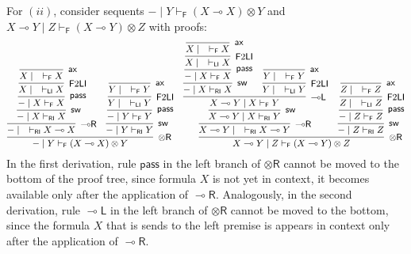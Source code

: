 \documentclass[submission,copyright,creativecommons]{eptcs}
\theoremstyle{definition}
\newcommand{\tr}{\otimes \mathsf{R}}
\newcommand{\lright}{{\multimap}\mathsf{R}}
\newcommand{\lleft}{{\multimap}\mathsf{L}}
\newcommand{\pass}{\mathsf{pass}}
\newcommand{\ax}{\mathsf{ax}}
\newcommand{\ot}{\otimes}
\newcommand{\lolli}{\multimap}
\newcommand{\RI}{\mathsf{RI}}
\newcommand{\LI}{\mathsf{LI}}
\newcommand{\F}{\mathsf{F}}
\newcommand{\SkNMILLA}{$\mathtt{SkNMILLA}$}
\begin{document}
For $(ii)$, consider sequents ${-} \mid Y \vdash_{\F} (X \lolli X) \ot Y$ and $X \lolli Y \mid Z \vdash_{\F} (X \lolli Y) \ot Z$ with proofs:
\begin{equation}\label{eq:counterexample1}
  \small
       \infer[\tr]{{-} \mid Y \vdash_{\F} (X \lolli X) \ot Y}{
      \infer[\lright]{{-} \mid \quad \vdash_{\RI} X \lolli X}{
        \infer[\mathsf{sw}]{{-} \mid X \vdash_{\RI} X}{
          \infer[\pass]{{-} \mid X \vdash_{\F} X}{
            \infer[\F 2 \LI]{X \mid \quad \vdash_{\LI} X}{
              \infer[\ax]{X \mid \quad \vdash_{\F} X}{}
            }
          }
        }
      }
      &
      \infer[\mathsf{sw}]{{-} \mid Y \vdash_{\RI} Y}{
        \infer[\pass]{{-} \mid Y \vdash_{\F} Y}{
          \infer[\F 2 \LI]{Y \mid \quad \vdash_{\LI} Y}{
            \infer[\ax]{Y \mid \quad \vdash_{\F} Y}{}
          }
        }
      }
     }
\quad
     \infer[\tr]{X \lolli Y \mid Z \vdash_{\F} (X \lolli Y) \ot Z}{
      \infer[\lright]{X \lolli Y \mid \quad \vdash_{\RI} X \lolli Y}{
        \infer[\mathsf{sw}]{X \lolli Y \mid X \vdash_{\RI} Y}{
          \infer[\lleft]{X \lolli Y \mid X \vdash_{\F} Y}{
            \infer[\mathsf{sw}]{{-} \mid X \vdash_{\RI} X}{
              \infer[\pass]{{-} \mid X \vdash_{\F} X}{
                \infer[\F 2 \LI]{X \mid \quad \vdash_{\LI} X}{
                  \infer[\ax]{X \mid \quad \vdash_{\F} X}{}
                }
              }
            }
            &
            \infer[\F 2 \LI]{Y \mid \quad \vdash_{\LI} Y}{
              \infer[\ax]{Y \mid \quad \vdash_{\F} Y}{}
            }
          }
        }
      }
      &
      \infer[\mathsf{sw}]{{-} \mid Z \vdash_{\RI} Z}{
        \infer[\pass]{{-} \mid Z \vdash_{\F} Z}{
          \infer[\F 2 \LI]{Z \mid \quad \vdash_{\LI} Z}{
            \infer[\ax]{Z \mid \quad \vdash_{\F} Z}{}
          }
        }
      }
     }     
\end{equation}
In the first derivation, rule $\pass$ in the left branch of $\tr$ cannot be moved to the bottom of the proof tree, since formula $X$ is not yet in context, it becomes available only after the application of $\lright$. Analogously, in the second derivation, rule $\lleft$ in the left branch of $\tr$ cannot be moved to the bottom, since the formula $X$ that is sends to the left premise is appears in context only after the application of $\lright$.

\end{document}
